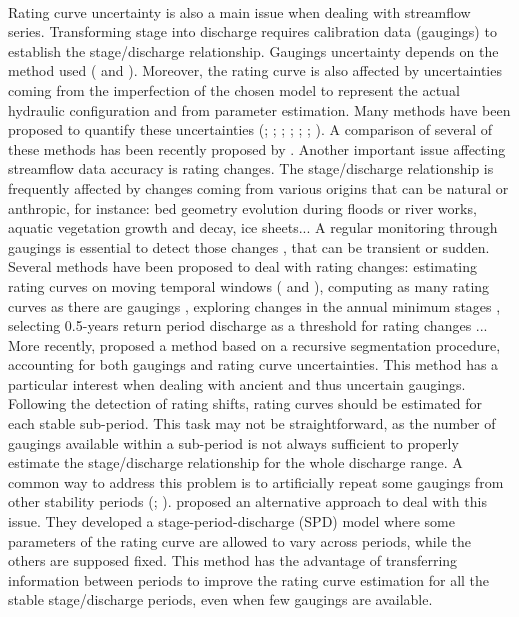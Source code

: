 \documentclass[11pt]{article}
\begin{document}
    \paragraph{}
    Rating curve uncertainty is also a main issue when dealing with streamflow series. Transforming stage into discharge requires calibration data (gaugings) to establish the stage/discharge relationship. Gaugings uncertainty depends on the method used (\citet{lecoz_quantification_2014} and \citet{puechberty_charte_2017}). Moreover, the rating curve is also affected by uncertainties coming from the imperfection of the chosen model to represent the actual hydraulic configuration and from parameter estimation. Many methods have been proposed to quantify these uncertainties (\citet{petersen-overleir_bayesian_2009}; \citet{juston_rating_2014}; \citet{le_coz_combining_2014}; \citet{morlot_dynamic_2014}; \citet{coxon_novel_2015}; \citet{mcmillan_rating_2015}; \citet{mansanarez_rapid_2019}). A comparison of several of these methods has been recently proposed by \citet{kiang_comparison_2018}. Another important issue affecting streamflow data accuracy is rating changes. The stage/discharge relationship is frequently affected by changes coming from various origins that can be natural or anthropic, for instance: bed geometry evolution during floods or river works, aquatic vegetation growth and decay, ice sheets... A regular monitoring through gaugings is essential to detect those changes \citep{ibbitt_gauging_1987}, that can be transient or sudden. Several methods have been proposed to deal with rating changes: estimating rating curves on moving temporal windows (\citet{westerberg_stage-discharge_2011} and \citet{guerrero_temporal_2012}), computing as many rating curves as there are gaugings \citep{morlot_dynamic_2014}, exploring changes in the annual minimum stages \citep{lapuszek_methods_2015}, selecting 0.5-years return period discharge as a threshold for rating changes \citep{mcmillan_impacts_2010}... More recently, \citet{darienzo_detection_2021} proposed a method based on a recursive segmentation procedure, accounting for both gaugings and rating curve uncertainties. This method has a particular interest when dealing with ancient and thus uncertain gaugings. Following the detection of rating shifts, rating curves should be estimated for each stable sub-period. This task may not be straightforward, as the number of gaugings available within a sub-period is not always sufficient to properly estimate the stage/discharge relationship for the whole discharge range. A common way to address this problem is to artificially repeat some gaugings from other stability periods (\citet{mcmillan_benchmarking_2012}; \citet{puechberty_charte_2017}). \citet{mansanarez_shift_2019} proposed an alternative approach to deal with this issue. They developed a stage-period-discharge (SPD) model  where some parameters of the rating curve are allowed to vary across periods, while the others are supposed fixed. This method has the advantage of transferring information between periods to improve the rating curve estimation for all the stable stage/discharge periods, even when few gaugings are available.
\end{document}
